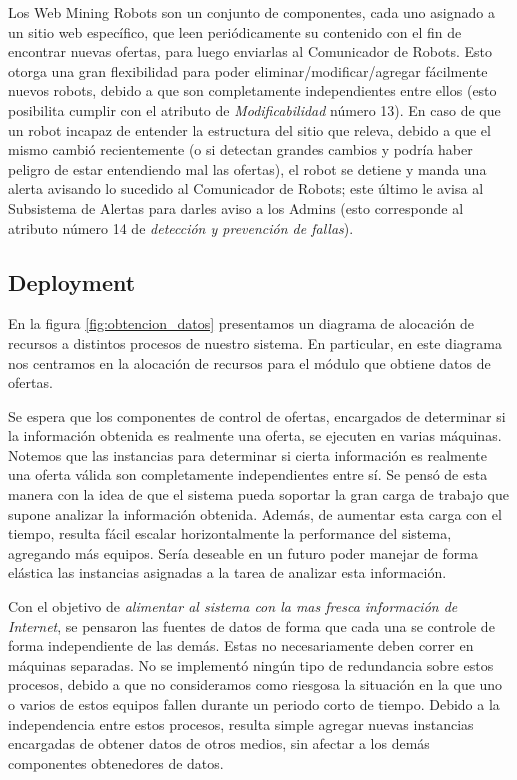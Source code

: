 Los \textsf{Web Mining Robots} son un conjunto de componentes, cada uno asignado a un sitio web específico, que leen periódicamente su contenido con el fin de encontrar nuevas ofertas, para luego enviarlas al \textsf{Comunicador de Robots}. Esto otorga una gran flexibilidad para poder eliminar/modificar/agregar fácilmente nuevos robots, debido a que son completamente independientes entre ellos (esto posibilita cumplir con el atributo de \emph{Modificabilidad} número 13). En caso de que un robot incapaz de entender la estructura del sitio que releva, debido a que el mismo cambió recientemente (o si detectan grandes cambios y podría haber peligro de estar entendiendo mal las ofertas), el robot se detiene y manda una alerta avisando lo sucedido al \textsf{Comunicador de Robots}; este último le avisa al \textsf{Subsistema de Alertas} para darles aviso a los Admins (esto corresponde al atributo número 14 de \emph{detección y prevención de fallas}).
\vspace{9pt}


\subsection{Deployment}

En la figura \ref{fig:obtencion_datos} presentamos un diagrama de alocación de recursos a distintos procesos de nuestro sistema. En particular, en este diagrama nos centramos en la alocación de recursos para el módulo que obtiene datos de ofertas. 

Se espera que los componentes de control de ofertas, encargados de determinar si la información obtenida es realmente una oferta, se ejecuten en varias máquinas. Notemos que las instancias para determinar si cierta  información es realmente una oferta válida son completamente independientes entre sí. Se pensó de esta manera con la idea de que el sistema pueda soportar la gran carga de trabajo que supone analizar la información obtenida. Además, de aumentar esta carga con el tiempo, resulta fácil escalar horizontalmente la performance del sistema, agregando más equipos. Sería deseable en un futuro poder manejar de forma elástica las instancias asignadas a la tarea de analizar esta información.

Con el objetivo de \emph{alimentar al sistema con la mas fresca información de Internet}, se pensaron las fuentes de datos de forma que cada una se controle de forma independiente de las demás. Estas no necesariamente deben correr en máquinas separadas. No se implementó ningún tipo de redundancia sobre estos procesos, debido a que no consideramos como riesgosa la situación en la que uno o varios de estos equipos fallen durante un periodo corto de tiempo. Debido a la independencia entre estos procesos, resulta simple agregar nuevas instancias encargadas de obtener datos de otros medios, sin afectar a los demás componentes obtenedores de datos.

